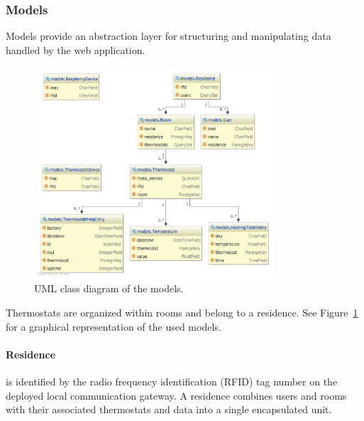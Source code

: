 \subsubsection{Models}

Models provide an abstraction layer for structuring and manipulating data handled by the web application.

\begin{figure}[h]
\begin{center}
\includegraphics[width=0.8\textwidth]{images/uml_class_diagram_pycharm_highres.png}
\end{center}
\caption{UML class diagram of the models.}
\label{fig:class_diagram}
\end{figure}

Thermostats are organized within rooms and belong to a residence. See Figure~\ref{fig:class_diagram} for a graphical representation of the used models.

\paragraph{Residence}

is identified by the radio frequency identification (RFID) tag number on the deployed local communication gateway. A residence combines users and rooms with their associated thermostats and data into a single encapsulated unit.

